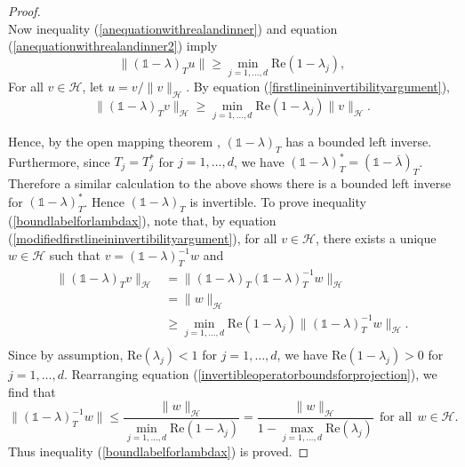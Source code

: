 \documentclass[11pt, reqno]{amsart}
\newcommand\1{\boldsymbol {1}}
\numberwithin{equation}{section}
\begin{document}
\begin{proof}
\begin{equation}
\end{equation}
Now inequality (\ref{anequationwithrealandinner}) and equation (\ref{anequationwithrealandinner2}) imply 
\begin{equation}\label{firstlineininvertibilityargument}
\| (\mathds{1}-\lambda)_{T}u\| \geq \underset{j=1,\hdots, d}{\min} \mathrm{Re}(1-\lambda_{j}),
\end{equation}
For all $v\in\mathcal{H}$, let $u = v/\|v\|_{\mathcal{H}}$. By equation (\ref{firstlineininvertibilityargument}),
\begin{equation}\label{modifiedfirstlineininvertibilityargument}
\| (\mathds{1}-\lambda)_{T} v \|_{\mathcal{H}}\geq \underset{j=1,\hdots, d}{\min}\mathrm{Re}(1-\lambda_{j}) \| v\|_{\mathcal{H}}.
\end{equation} 

Hence, by the open mapping theorem \cite[Theorem 4.43]{RynneYoungson},  $(\mathds{1}-\lambda)_{T}$ has a bounded left inverse. Furthermore, since $T_{j}=T_{j}^{*}$ for $j=1,\hdots,d$, we have $(\mathds{1}-\lambda)_{T}^{*} = (\mathds{1}-\overline{\lambda})_{T}$. Therefore a similar calculation to the above shows there is a bounded left inverse for $(\mathds{1}-\lambda)_{T}^{*}$. Hence $(\mathds{1}-\lambda)_{T}$ is invertible. To prove inequality (\ref{boundlabelforlambdax}), note that, by equation (\ref{modifiedfirstlineininvertibilityargument}), for all $v \in\mathcal{H}$, there exists a unique $w \in\mathcal{H}$ such that $v=(\mathds{1}-\lambda)_{T}^{-1}w$ and
\begin{align}
\| (\mathds{1}-\lambda)_{T} v \|_{\mathcal{H}} 	& = \| (\mathds{1}-\lambda)_{T} (\mathds{1}-\lambda)_{T}^{-1}w \|_{\mathcal{H}} \nonumber \\
						& = \| w \|_{\mathcal{H}} \nonumber \\
						&\geq \underset{j=1,\hdots, d}{\min}\mathrm{Re}(1-\lambda_{j}) \| (\mathds{1}-\lambda)_{T}^{-1}w\|_{\mathcal{H}} \label{invertibleoperatorboundsforprojection}. \\ \nonumber
\end{align}
Since by assumption, $\mathrm{Re}(\lambda_{j})<1$ for $j=1,\hdots,d$, we have $\mathrm{Re}(1-\lambda_{j}) >0$ for $j=1,\hdots,d$. Rearranging equation (\ref{invertibleoperatorboundsforprojection}), we find that 
$$ \| (\mathds{1}-\lambda)_{T}^{-1}w \| \leq \dfrac{\|w\|_{\mathcal{H}}}{\underset{j=1,\hdots,d}{\min}\mathrm{Re}(1-\lambda_{j})} = \dfrac{\|w\|_{\mathcal{H}}}{1-\underset{j=1,\hdots,d}{\max}\mathrm{Re}(\lambda_{j})}~~\text{for all}~~w\in\mathcal{H}.$$
Thus inequality (\ref{boundlabelforlambdax}) is proved.


\end{proof}
\end{document}
